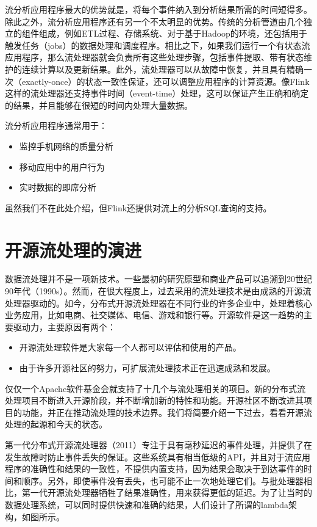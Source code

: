\documentclass[cn,11pt,chinese]{elegantbook}
\providecommand{\tightlist}{%
  \setlength{\itemsep}{0pt}\setlength{\parskip}{0pt}}
\begin{document}
流分析应用程序最大的优势就是，将每个事件纳入到分析结果所需的时间短得多。除此之外，流分析应用程序还有另一个不太明显的优势。传统的分析管道由几个独立的组件组成，例如ETL过程、存储系统、对于基于Hadoop的环境，还包括用于触发任务（jobs）的数据处理和调度程序。相比之下，如果我们运行一个有状态流应用程序，那么流处理器就会负责所有这些处理步骤，包括事件提取、带有状态维护的连续计算以及更新结果。此外，流处理器可以从故障中恢复，并且具有精确一次（exactly-once）的状态一致性保证，还可以调整应用程序的计算资源。像Flink这样的流处理器还支持事件时间（event-time）处理，这可以保证产生正确和确定的结果，并且能够在很短的时间内处理大量数据。

流分析应用程序通常用于：

\begin{itemize}
\tightlist
\item
  监控手机网络的质量分析
\item
  移动应用中的用户行为
\item
  实时数据的即席分析
\end{itemize}

虽然我们不在此处介绍，但Flink还提供对流上的分析SQL查询的支持。

\hypertarget{ux5f00ux6e90ux6d41ux5904ux7406ux7684ux6f14ux8fdb}{%
\section{开源流处理的演进}\label{ux5f00ux6e90ux6d41ux5904ux7406ux7684ux6f14ux8fdb}}

数据流处理并不是一项新技术。一些最初的研究原型和商业产品可以追溯到20世纪90年代（1990s）。然而，在很大程度上，过去采用的流处理技术是由成熟的开源流处理器驱动的。如今，分布式开源流处理器在不同行业的许多企业中，处理着核心业务应用，比如电商、社交媒体、电信、游戏和银行等。开源软件是这一趋势的主要驱动力，主要原因有两个：

\begin{itemize}
\tightlist
\item
  开源流处理软件是大家每一个人都可以评估和使用的产品。
\item
  由于许多开源社区的努力，可扩展流处理技术正在迅速成熟和发展。
\end{itemize}

仅仅一个Apache软件基金会就支持了十几个与流处理相关的项目。新的分布式流处理项目不断进入开源阶段，并不断增加新的特性和功能。开源社区不断改进其项目的功能，并正在推动流处理的技术边界。我们将简要介绍一下过去，看看开源流处理的起源和今天的状态。

第一代分布式开源流处理器（2011）专注于具有毫秒延迟的事件处理，并提供了在发生故障时防止事件丢失的保证。这些系统具有相当低级的API，并且对于流应用程序的准确性和结果的一致性，不提供内置支持，因为结果会取决于到达事件的时间和顺序。另外，即使事件没有丢失，也可能不止一次地处理它们。与批处理器相比，第一代开源流处理器牺牲了结果准确性，用来获得更低的延迟。为了让当时的数据处理系统，可以同时提供快速和准确的结果，人们设计了所谓的lambda架构，如图所示。
\end{document}
